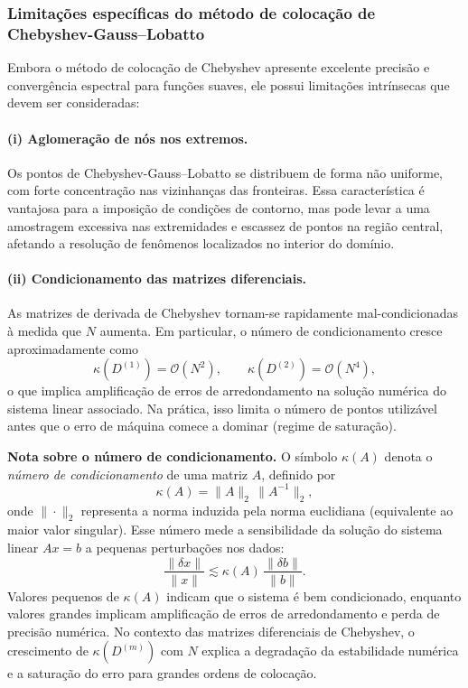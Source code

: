 \documentclass[11pt,a4paper]{article}
\begin{document}
\subsubsection{Limitações específicas do método de colocação de Chebyshev-Gauss–Lobatto}

Embora o método de colocação de Chebyshev apresente excelente precisão e convergência espectral para funções suaves, ele possui limitações intrínsecas que devem ser consideradas:

\paragraph{(i) Aglomeração de nós nos extremos.}
Os pontos de Chebyshev-Gauss–Lobatto se distribuem de forma não uniforme, com forte concentração nas vizinhanças das fronteiras.  
Essa característica é vantajosa para a imposição de condições de contorno, mas pode levar a uma amostragem excessiva nas extremidades e escassez de pontos na região central, afetando a resolução de fenômenos localizados no interior do domínio.

\paragraph{(ii) Condicionamento das matrizes diferenciais.}
As matrizes de derivada de Chebyshev tornam-se rapidamente mal-condicionadas à medida que $N$ aumenta.  
Em particular, o número de condicionamento cresce aproximadamente como
\[
\kappa(D^{(1)}) = \mathcal{O}(N^2), 
\qquad 
\kappa(D^{(2)}) = \mathcal{O}(N^4),
\]
o que implica amplificação de erros de arredondamento na solução numérica do sistema linear associado.  
Na prática, isso limita o número de pontos utilizável antes que o erro de máquina comece a dominar (regime de saturação).

\begin{small}
\noindent \textbf{Nota sobre o número de condicionamento.} \;
O símbolo $\kappa(A)$ denota o \emph{número de condicionamento} de uma matriz $A$, definido por
\[
\kappa(A) = \|A\|_2 \, \|A^{-1}\|_2,
\]
onde $\|\cdot\|_2$ representa a norma induzida pela norma euclidiana (equivalente ao maior valor singular).
Esse número mede a sensibilidade da solução do sistema linear $A x = b$ a pequenas perturbações nos dados:
\[
\frac{\|\delta x\|}{\|x\|} \lesssim \kappa(A)\,
\frac{\|\delta b\|}{\|b\|}.
\]
Valores pequenos de $\kappa(A)$ indicam que o sistema é bem condicionado, 
enquanto valores grandes implicam amplificação de erros de arredondamento e perda de precisão numérica. 
No contexto das matrizes diferenciais de Chebyshev, o crescimento de $\kappa(D^{(m)})$ com $N$ explica a degradação da estabilidade numérica e a saturação do erro para grandes ordens de colocação.
\end{small}
\end{document}
